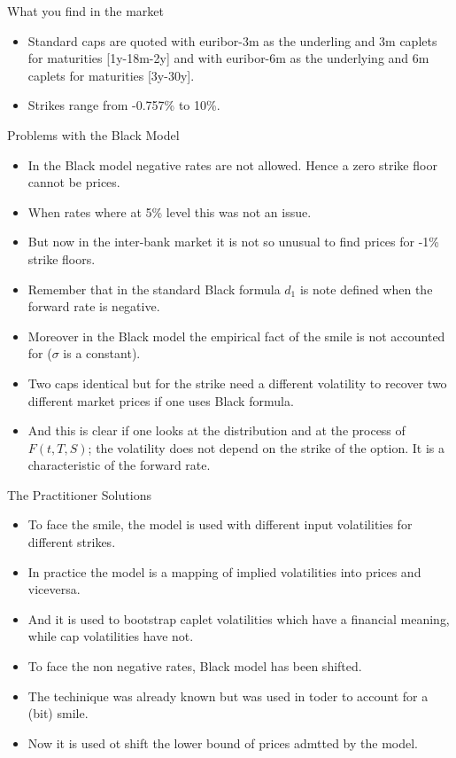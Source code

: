 \documentclass{beamer}
\begin{document}
\begin{frame}{What you find in the market}
	\begin{itemize}
		\item Standard caps are quoted with euribor-3m as the underling and 3m caplets for maturities [1y-18m-2y] and with euribor-6m as the underlying and 6m caplets for maturities [3y-30y].
		\item Strikes range from -0.757\% to 10\%.
	\end{itemize}
\end{frame}


\begin{frame}{Problems with the Black Model}
	\begin{itemize}
		\item In the Black model negative rates are not allowed. Hence a zero strike floor cannot be prices.
		\item When rates where at 5\% level this was not an issue.
		\item But now in the inter-bank market it is not so unusual to find prices for -1\% strike floors.
		\item Remember that in the standard Black formula $d_1$ is note defined when the forward rate is negative.
		\item Moreover in the Black model the empirical fact of the smile is not accounted for ($\sigma$ is a constant).
		\item Two caps identical but for the strike need a different volatility to recover two different market prices if one uses Black formula.
		\item And this is clear if one looks at the distribution and at the process of $F(t, T, S)$; the volatility does not depend on the strike of the option. It is a characteristic of the forward rate.
	\end{itemize}
\end{frame}

\begin{frame}{The Practitioner Solutions}
	\begin{itemize}
		\item To face the smile, the model is used with different input volatilities for different strikes.
		\item In practice the model is a mapping of implied volatilities into prices and viceversa.
		\item And it is used to bootstrap caplet volatilities which have a financial meaning, while cap volatilities have not.
		\item To face the non negative rates, Black model has been shifted.
		\item The techinique was already known but was used in toder to account for a (bit) smile.
		\item Now it is used ot shift the lower bound of prices admtted by the model.
	\end{itemize}
\end{frame}
\end{document}
